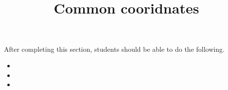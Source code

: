 \documentclass{ximera}
\title{Common cooridnates}
\begin{document}
\begin{abstract}
\end{abstract}
\maketitle

\begin{sectionOutcomes}

After completing this section, students should be able to do the following.

\begin{itemize}
\item 
\item 
\item 
\end{itemize}

\end{sectionOutcomes}
\end{document}
